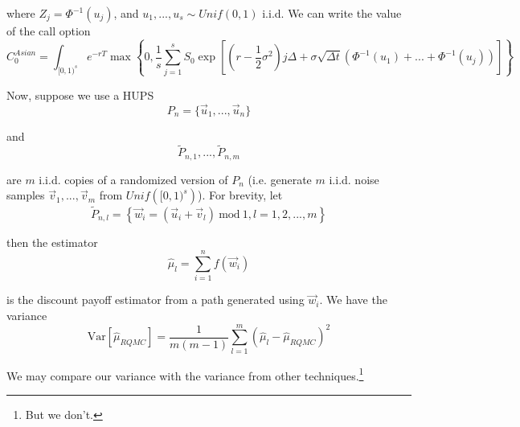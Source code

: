 \documentclass[12pt]{article}
\newcommand{\var}{\mathrm{Var}}
\renewcommand{\mod}{\mathrm{~mod~}}
\begin{document}
where $Z_j = \Phi^{-1}(u_j)$, and $u_1, ..., u_s \sim Unif(0,1)$ i.i.d. We can write the value of the call option
\begin{equation*}
	C^{Asian}_0 = \int_{[0,1)^s} e^{-rT} \max \left\{0, \frac{1}{s} \sum^s_{j = 1} S_0 \exp \left[ \left(r - \frac{1}{2}\sigma^2\right) j\Delta + \sigma\sqrt{\Delta t} \left(\Phi^{-1}(u_1) + ... + \Phi^{-1}(u_j)\right) \right] \right\}
\end{equation*}

Now, suppose we use a HUPS
\begin{equation*}
	P_n = \{\vec{u}_1, ..., \vec{u}_n\}
\end{equation*}

and
\begin{equation*}
	\tilde{P}_{n,1}, ..., \tilde{P}_{n,m}
\end{equation*}

are $m$ i.i.d. copies of a randomized version of $P_n$ (i.e. generate $m$ i.i.d. noise samples $\vec{v}_1, ..., \vec{v}_m$ from $Unif\left([0,1)^s\right)$). For brevity, let
\begin{equation*}
	\tilde{P}_{n, l} = \left\{ \vec{w}_i = \left( \vec{u}_i + \vec{v}_l \right) \mod 1, l = 1, 2, ..., m \right\}
\end{equation*}

then the estimator
\begin{equation*}
	\hat{\mu}_l = \sum^n_{i = 1} f(\vec{w}_i)
\end{equation*}

is the discount payoff estimator from a path generated using $\vec{w}_i$. We have the variance
\begin{equation*}
	\var\left[\hat{\mu}_{RQMC}\right] = \frac{1}{m(m - 1)} \sum^m_{l = 1} \left( \hat{\mu}_l - \hat{\mu}_{RQMC} \right)^2
\end{equation*}

We may compare our variance with the variance from other techniques.\footnote{But we don't.}
\end{document}
